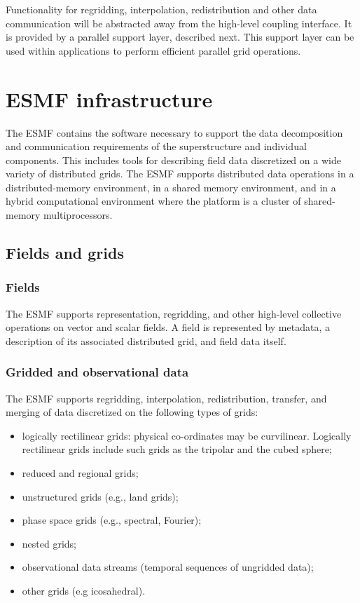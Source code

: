 Functionality for regridding, interpolation, redistribution and other 
data communication will be abstracted away from the high-level coupling
interface.  It is provided by a parallel support layer, described next.  
This support layer can be used within applications 
to perform efficient parallel grid operations.

\section{ESMF infrastructure}
\label{sec:ESMF_infrastructure}

The ESMF contains the software necessary to support the data
decomposition and communication requirements of the superstructure and
individual components.  This includes tools for describing field
data discretized on a wide variety of distributed grids.  The ESMF
supports distributed data operations in a distributed-memory environment, 
in a shared memory environment, and in a hybrid computational environment 
where the platform is a cluster of shared-memory multiprocessors.

\subsection{Fields and grids}

\subsubsection{Fields}
The ESMF supports representation, regridding, and other high-level
collective operations on vector and scalar fields.  A field is represented 
by metadata, a description of its associated distributed grid, and field 
data itself.

\subsubsection{Gridded and observational data}

The ESMF supports regridding, interpolation, redistribution,
transfer, and merging of data discretized on the following types of grids:

\begin{itemize}
\item logically rectilinear grids: physical co-ordinates may be
  curvilinear. Logically rectilinear grids include such grids as the
  tripolar and the cubed sphere;
\item reduced and regional grids;
\item unstructured grids (e.g., land grids);
\item phase space grids (e.g., spectral, Fourier);
\item nested grids;
\item observational data streams (temporal sequences of ungridded data);
\item other grids (e.g icosahedral).
\end{itemize}

